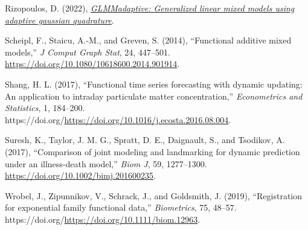 \documentclass[
  11pt,
]{article}
\newlength{\cslhangindent}
\newlength{\cslentryspacingunit} %
\newenvironment{CSLReferences}[2] %
 {%
  \setlength{\parindent}{0pt}
  \ifodd #1
  \let\oldpar\par
  \def\par{\hangindent=\cslhangindent\oldpar}
  \fi
  \setlength{\parskip}{#2\cslentryspacingunit}
 }%
 {}
\begin{document}
\begin{CSLReferences}{1}{0}
\leavevmode{}%
Rizopoulos, D. (2022),
\emph{\href{https://CRAN.R-project.org/package=GLMMadaptive}{GLMMadaptive:
Generalized linear mixed models using adaptive gaussian quadrature}}.

\leavevmode{}%
Scheipl, F., Staicu, A.-M., and Greven, S. (2014), {``Functional
additive mixed models,''} \emph{J Comput Graph Stat}, 24, 447--501.
\url{https://doi.org/10.1080/10618600.2014.901914}.

\leavevmode{}%
Shang, H. L. (2017), {``Functional time series forecasting with dynamic
updating: An application to intraday particulate matter
concentration,''} \emph{Econometrics and Statistics}, 1, 184--200.
https://doi.org/\url{https://doi.org/10.1016/j.ecosta.2016.08.004}.

\leavevmode{}%
Suresh, K., Taylor, J. M. G., Spratt, D. E., Daignault, S., and
Tsodikov, A. (2017), {``Comparison of joint modeling and landmarking for
dynamic prediction under an illness-death model,''} \emph{Biom J}, 59,
1277--1300. \url{https://doi.org/10.1002/bimj.201600235}.

\leavevmode{}%
Wrobel, J., Zipunnikov, V., Schrack, J., and Goldsmith, J. (2019),
{``Registration for exponential family functional data,''}
\emph{Biometrics}, 75, 48--57.
https://doi.org/\url{https://doi.org/10.1111/biom.12963}.

\end{CSLReferences}
\end{document}
